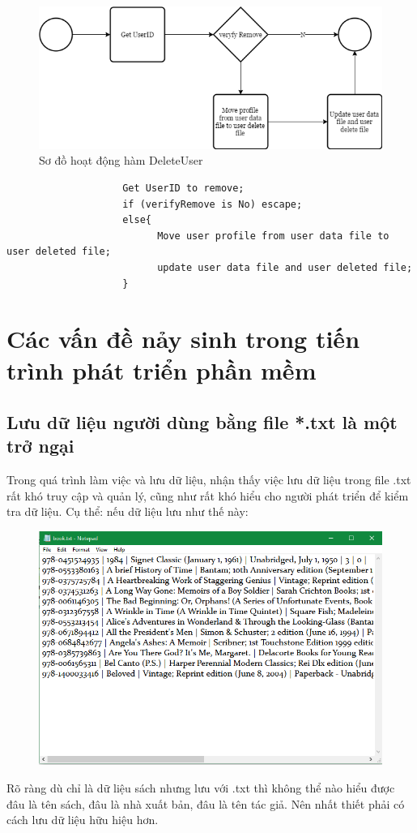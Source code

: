 \documentclass[12pt,a4paper]{report}
\begin{document}
                \begin{figure}[H]
                    \centering
                    \label{F:deleteuser}
                    \includegraphics[scale = .4]{deleteuser.png}
                    \caption{Sơ đồ hoạt động hàm DeleteUser}
                \end{figure}
                \begin{verbatim}
                    Get UserID to remove;
                    if (verifyRemove is No) escape;
                    else{
                          Move user profile from user data file to user deleted file;
                          update user data file and user deleted file;
                    }
                \end{verbatim}
\chapter{Các vấn đề nảy sinh trong tiến trình phát triển phần mềm}
    \section{Lưu dữ liệu người dùng bằng file *.txt là một trở ngại}
    Trong quá trình làm việc và lưu dữ liệu, nhận thấy việc lưu dữ liệu trong file .txt rất khó truy cập và quản lý, cũng như rất khó hiểu cho người phát triển để kiểm tra dữ liệu. Cụ thể: nếu dữ liệu lưu như thế này:
        \begin{figure}[H]
            \centering
            \label{F:booktext}
            \includegraphics[scale = .7]{booktext.png}
        \end{figure}
    Rõ ràng dù chỉ là dữ liệu sách nhưng lưu với .txt thì không thể nào hiểu được đâu là tên sách, đâu là nhà xuất bản, đâu là tên tác giả. Nên nhất thiết phải có cách lưu dữ liệu hữu hiệu hơn.\\
\end{document}
